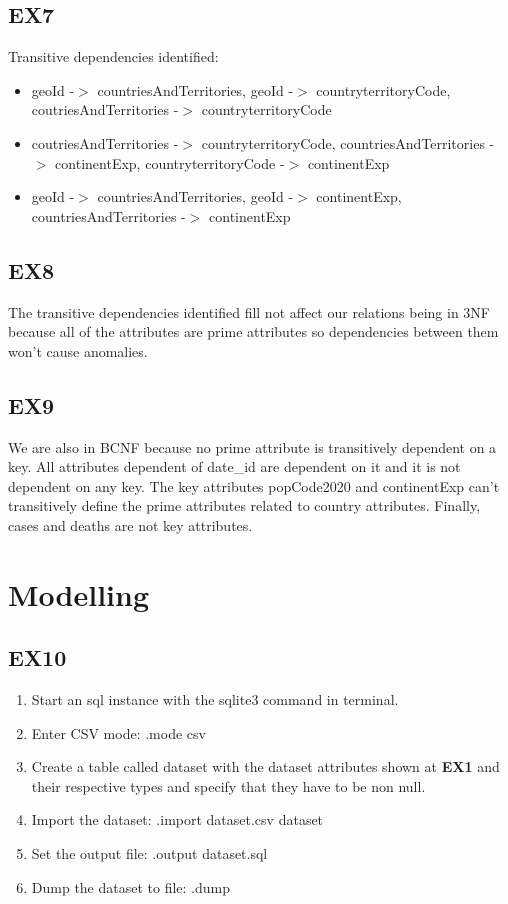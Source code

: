 \documentclass[12pt,oneside,a4paper,english]{article}
\begin{document}
\subsection{EX7}
\noindent Transitive dependencies identified:
\begin{itemize}
 \item { geoId -$>$ countriesAndTerritories, geoId -$>$ countryterritoryCode, coutriesAndTerritories -$>$ countryterritoryCode}
 \item { coutriesAndTerritories -$>$ countryterritoryCode, countriesAndTerritories -$>$ continentExp, countryterritoryCode -$>$ continentExp}
 \item { geoId -$>$ countriesAndTerritories, geoId -$>$ continentExp, countriesAndTerritories -$>$ continentExp}
\end{itemize}

\subsection{EX8}
\noindent The transitive dependencies identified fill not affect our relations being in 3NF because all of the attributes are prime attributes so dependencies between them won't cause anomalies.

\subsection{EX9}
\noindent We are also in BCNF because no prime attribute is transitively dependent on a key. All attributes dependent of date\_id are dependent on it and it is not dependent on any key. The key attributes popCode2020 and continentExp can't transitively define the prime attributes related to country attributes. Finally, cases and deaths are not key attributes.

\section{Modelling}
\subsection{EX10}
\begin{enumerate}
 \item Start an sql instance with the sqlite3 command in terminal.
 \item Enter CSV mode: .mode csv
 \item Create a table called dataset with the dataset attributes shown at \textbf{EX1} and their respective types and specify that they have to be non null.
 \item Import the dataset: .import dataset.csv dataset
 \item Set the output file: .output dataset.sql
 \item Dump the dataset to file: .dump
\end{enumerate}
\end{document}
